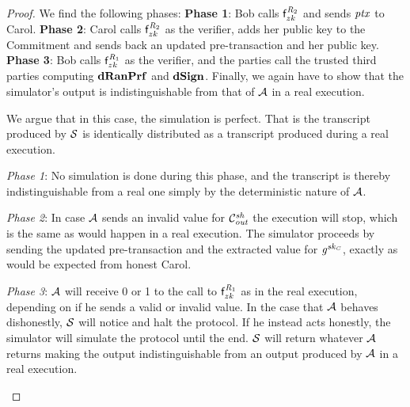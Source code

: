 \begin{proof}
    We find the following phases:
    \textbf{Phase 1}: Bob calls $\mathsf{f}^{\mathit{R}_2}_{zk}$ and sends $\mathit{ptx}$ to Carol.
    \textbf{Phase 2}: Carol calls $\mathsf{f}^{\mathit{R}_2}_{zk}$ as the verifier, adds her public key to the Commitment and sends back an updated pre-transaction and her public key.
    \textbf{Phase 3}: Bob calls $\mathsf{f}^{\mathit{R}_1}_{zk}$ as the verifier, and the parties call the trusted third parties computing $\mathbf{dRanPrf}$ and $\mathbf{dSign}$.
    Finally, we again have to show that the simulator's output is indistinguishable from that of $\mathcal{A}$ in a real execution.

    We argue that in this case, the simulation is perfect.
    That is the transcript produced by $\mathcal{S}$ is identically distributed as a transcript produced during a real execution.
    \begin{asparaitem}
        \item \textit{Phase 1}: No simulation is done during this phase, and the transcript is thereby indistinguishable from a real one simply by the deterministic nature of $\mathcal{A}$.
        \item \textit{Phase 2}: In case $\mathcal{A}$ sends an invalid value for $\mathcal{C}_{\mathit{out}}^{\mathit{sh}}$ the execution will stop, which is the same as would happen in a real execution.
        The simulator proceeds by sending the updated pre-transaction and the extracted value for $\mathit{g}^{\mathit{sk}_{\mathit{C}}}$, exactly as would be expected from honest Carol.
        \item \textit{Phase 3}: $\mathcal{A}$ will receive 0 or 1 to the call to $\mathsf{f}^{\mathit{R}_1}_{zk}$ as in the real execution, depending on if he sends a valid or invalid value.
        In the case that $\mathcal{A}$ behaves dishonestly, $\mathcal{S}$ will notice and halt the protocol.
        If he instead acts honestly, the simulator will simulate the protocol until the end.
        $\mathcal{S}$ will return whatever $\mathcal{A}$ returns making the output indistinguishable from an output produced by $\mathcal{A}$ in a real execution.
    \end{asparaitem}


\end{proof}

